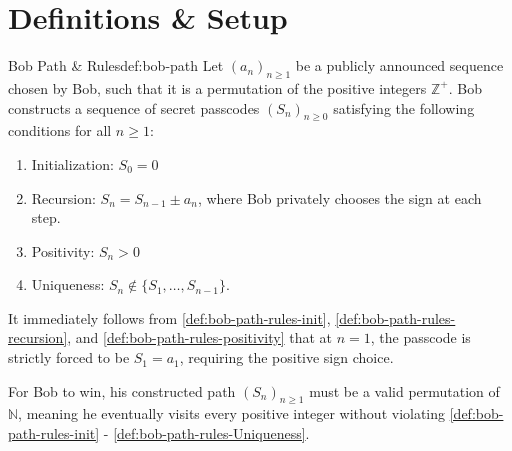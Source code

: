\section{Definitions \& Setup}

\begin{definition}{Bob Path \& Rules}{def:bob-path}
Let $(a_n)_{n \ge 1}$ be a publicly announced sequence chosen by Bob, such that it is a permutation of the positive integers $\mathbb{Z}^+$. Bob constructs a sequence of secret passcodes $(S_n)_{n \ge 0}$ satisfying the following conditions for all $n \ge 1$: 

\begin{enumerate}[label=B\arabic*,ref=B\arabic*]

\item \label{def:bob-path-rules-init} Initialization: $S_0 = 0$

\item \label{def:bob-path-rules-recursion} Recursion: $S_n = S_{n-1} \pm a_n$, where Bob privately chooses the sign at each step.

\item \label{def:bob-path-rules-positivity} Positivity: $S_n > 0$

\item \label{def:bob-path-rules-Uniqueness} Uniqueness: $S_n \notin \{S_1, \dots, S_{n-1}\}$. 
\end{enumerate}

\end{definition}

\begin{remark}\label{remark:bob-rules-initial-passcode} It immediately follows from \ref{def:bob-path-rules-init}, \ref{def:bob-path-rules-recursion}, and \ref{def:bob-path-rules-positivity} that at $n=1$, the passcode is strictly forced to be $S_1 = a_1$, requiring the positive sign choice. 
\end{remark}

\begin{remark}\label{remark:bob-rules-bob-win} For Bob to win, his constructed path $(S_n)_{n \ge 1}$ must be a valid permutation of $\mathbb{N}$, meaning he eventually visits every positive integer without violating \ref{def:bob-path-rules-init} - \ref{def:bob-path-rules-Uniqueness}.
\end{remark}

